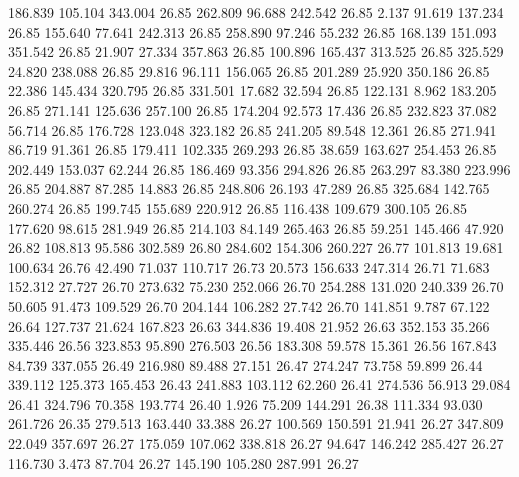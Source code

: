  186.839  105.104  343.004        26.85
 262.809   96.688  242.542        26.85
   2.137   91.619  137.234        26.85
 155.640   77.641  242.313        26.85
 258.890   97.246   55.232        26.85
 168.139  151.093  351.542        26.85
  21.907   27.334  357.863        26.85
 100.896  165.437  313.525        26.85
 325.529   24.820  238.088        26.85
  29.816   96.111  156.065        26.85
 201.289   25.920  350.186        26.85
  22.386  145.434  320.795        26.85
 331.501   17.682   32.594        26.85
 122.131    8.962  183.205        26.85
 271.141  125.636  257.100        26.85
 174.204   92.573   17.436        26.85
 232.823   37.082   56.714        26.85
 176.728  123.048  323.182        26.85
 241.205   89.548   12.361        26.85
 271.941   86.719   91.361        26.85
 179.411  102.335  269.293        26.85
  38.659  163.627  254.453        26.85
 202.449  153.037   62.244        26.85
 186.469   93.356  294.826        26.85
 263.297   83.380  223.996        26.85
 204.887   87.285   14.883        26.85
 248.806   26.193   47.289        26.85
 325.684  142.765  260.274        26.85
 199.745  155.689  220.912        26.85
 116.438  109.679  300.105        26.85
 177.620   98.615  281.949        26.85
 214.103   84.149  265.463        26.85
  59.251  145.466   47.920        26.82
 108.813   95.586  302.589        26.80
 284.602  154.306  260.227        26.77
 101.813   19.681  100.634        26.76
  42.490   71.037  110.717        26.73
  20.573  156.633  247.314        26.71
  71.683  152.312   27.727        26.70
 273.632   75.230  252.066        26.70
 254.288  131.020  240.339        26.70
  50.605   91.473  109.529        26.70
 204.144  106.282   27.742        26.70
 141.851    9.787   67.122        26.64
 127.737   21.624  167.823        26.63
 344.836   19.408   21.952        26.63
 352.153   35.266  335.446        26.56
 323.853   95.890  276.503        26.56
 183.308   59.578   15.361        26.56
 167.843   84.739  337.055        26.49
 216.980   89.488   27.151        26.47
 274.247   73.758   59.899        26.44
 339.112  125.373  165.453        26.43
 241.883  103.112   62.260        26.41
 274.536   56.913   29.084        26.41
 324.796   70.358  193.774        26.40
   1.926   75.209  144.291        26.38
 111.334   93.030  261.726        26.35
 279.513  163.440   33.388        26.27
 100.569  150.591   21.941        26.27
 347.809   22.049  357.697        26.27
 175.059  107.062  338.818        26.27
  94.647  146.242  285.427        26.27
 116.730    3.473   87.704        26.27
 145.190  105.280  287.991        26.27
